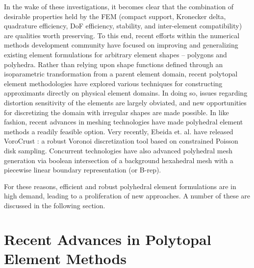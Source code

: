 	In the wake of these investigations, it becomes clear that the combination of desirable properties held by the FEM (compact support, Kronecker delta, quadrature efficiency, DoF efficiency, stability, and inter-element compatibility) are qualities worth preserving. To this end, recent efforts within the numerical methods development community have focused on improving and generalizing existing element formulations for arbitrary element shapes -- polygons and polyhedra. Rather than relying upon shape functions defined through an isoparametric transformation from a parent element domain, recent polytopal element methodologies have explored various techniques for constructing approximants directly on physical element domains. In doing so, issues regarding distortion sensitivity of the elements are largely obviated, and new opportunities for discretizing the domain with irregular shapes are made possible.
	In like fashion, recent advances in meshing technologies have made polyhedral element methods a readily feasible option. Very recently, Ebeida et. al. have released VoroCrust \cite{Ebeida:17}: a robust Voronoi discretization tool based on constrained Poisson disk sampling. Concurrent technologies have also advanced polyhedral mesh generation via boolean intersection of a background hexahedral mesh with a piecewise linear boundary representation (or B-rep).

	For these reasons, efficient and robust polyhedral element formulations are in high demand, leading to a proliferation of new approaches. A number of these are discussed in the following section.

\section{Recent Advances in Polytopal Element Methods} %

